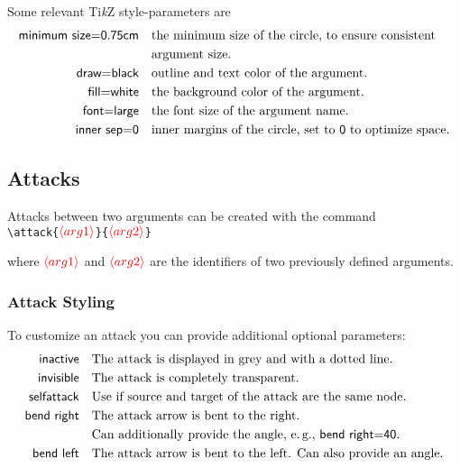\documentclass{article}
\newcommand{\tikzname}{Ti\emph{k}Z\xspace}
\newcommand{\opt}[2][red]{\ensuremath{\textcolor{#1}{\langle #2\rangle}}}
\begin{document}
    Some relevant \tikzname style-parameters are
    \begin{align*}
        \textsf{minimum~size=0.75cm} &\quad \text{the minimum size of the circle, to ensure consistent}\\
        &\quad \text{argument size.}\\
        \textsf{draw=black} &\quad \text{outline and text color of the argument.}\\
        \textsf{fill=white} &\quad \text{the background color of the argument.}\\
        \textsf{font=large} &\quad \text{the font size of the argument name.}\\
        \textsf{inner~sep=0} &\quad \text{inner margins of the circle, set to \textsf{0} to optimize space.}
    \end{align*}
    

\subsection{Attacks}
    Attacks between two arguments can be created with the command\\

    \noindent
    \verb|\attack{|\opt{arg1}\verb|}{|\opt{arg2}\verb|}|

    \begin{list}{}{\leftmargin=\parindent\rightmargin=0pt}
        \item where \opt{arg1} and \opt{arg2} are the identifiers of two previously defined arguments.
    \end{list}

    
\subsubsection{Attack Styling}
    To customize an attack you can provide additional optional parameters:
    \begin{align*}
        \mathsf{inactive} &\quad \text{The attack is displayed in grey and with a dotted line.}\\
        \mathsf{invisible} &\quad \text{The attack is completely transparent.}\\
        \mathsf{selfattack} &\quad \text{Use if source and target of the attack are the same node.}\\
        \mathsf{bend~right} &\quad \text{The attack arrow is bent to the right.}\\
        &\quad \text{Can additionally provide the angle, e.\,g., \textsf{bend~right=40}.}\\
        \mathsf{bend~left} &\quad \text{The attack arrow is bent to the left. Can also provide an angle.}\\
    \end{align*}
    
\end{document}
